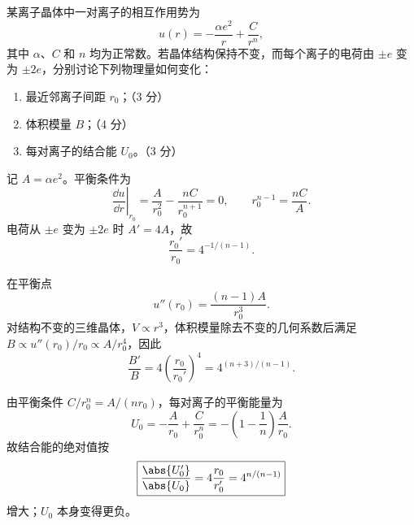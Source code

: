 \begin{question}[10 分]
某离子晶体中一对离子的相互作用势为
\[
  u(r)=-\frac{\alpha e^2}{r}+\frac{C}{r^n},
\]
其中 $\alpha$、$C$ 和 $n$ 均为正常数。若晶体结构保持不变，而每个离子的电荷由 $\pm e$ 变为 $\pm2e$，分别讨论下列物理量如何变化：
\begin{enumerate}
  \item 最近邻离子间距 $r_0$；（3 分）
  \item 体积模量 $B$；（4 分）
  \item 每对离子的结合能 $U_0$。（3 分）
\end{enumerate}


\begin{solution}
记 $A=\alpha e^2$。平衡条件为
\[
 \left.\frac{\dd u}{\dd r}\right|_{r_0}
 =\frac{A}{r_0^2}-\frac{nC}{r_0^{n+1}}=0,
 \qquad
 r_0^{n-1}=\frac{nC}{A}.
\]
电荷从 $\pm e$ 变为 $\pm2e$ 时 $A'=4A$，故
\[
 \boxed{\frac{r_0'}{r_0}=4^{-1/(n-1)}.}
\]

在平衡点
\[
 u''(r_0)=\frac{(n-1)A}{r_0^3}.
\]
对结构不变的三维晶体，$V\propto r^3$，体积模量除去不变的几何系数后满足
$B\propto u''(r_0)/r_0\propto A/r_0^4$，因此
\[
 \boxed{\frac{B'}B=4\left(\frac{r_0}{r_0'}\right)^4
 =4^{(n+3)/(n-1)}.}
\]

由平衡条件 $C/r_0^n=A/(nr_0)$，每对离子的平衡能量为
\[
 U_0=-\frac{A}{r_0}+\frac{C}{r_0^n}
 =-\left(1-\frac1n\right)\frac{A}{r_0}.
\]
故结合能的绝对值按
\[
 \boxed{\frac{\abs{U_0'}}{\abs{U_0}}
 =4\frac{r_0}{r_0'}=4^{n/(n-1)}}
\]
增大；$U_0$ 本身变得更负。
\end{solution}
\end{question}

